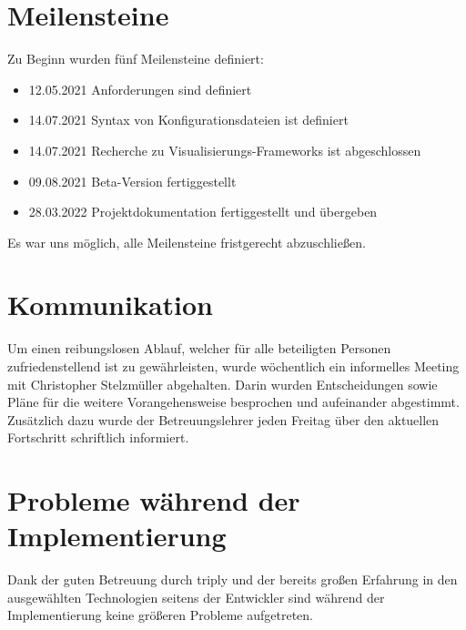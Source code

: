 \section{Meilensteine}
Zu Beginn wurden fünf Meilensteine definiert:

\begin{itemize}
    \item 12.05.2021 Anforderungen sind definiert
    \item 14.07.2021 Syntax von Konfigurationsdateien ist definiert
    \item 14.07.2021 Recherche zu Visualisierungs-Frameworks ist abgeschlossen
    \item 09.08.2021 Beta-Version fertiggestellt
    \item 28.03.2022 Projektdokumentation fertiggestellt und übergeben
\end{itemize}

Es war uns möglich, alle Meilensteine fristgerecht abzuschließen.

\section{Kommunikation}
Um einen reibungslosen Ablauf, welcher für alle beteiligten Personen zufriedenstellend ist zu gewährleisten, wurde wöchentlich
ein informelles Meeting mit Christopher Stelzmüller abgehalten.
Darin wurden Entscheidungen sowie Pläne für die weitere Vorangehensweise besprochen und aufeinander abgestimmt.
Zusätzlich dazu wurde der Betreuungslehrer jeden Freitag über den aktuellen Fortschritt schriftlich informiert.

\section{Probleme während der Implementierung}
Dank der guten Betreuung durch triply und der bereits großen Erfahrung in den ausgewählten Technologien seitens der
Entwickler sind während der Implementierung keine größeren Probleme aufgetreten.
